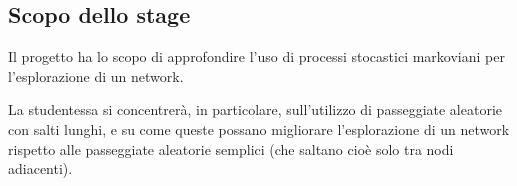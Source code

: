 
\subsection{Scopo dello stage}
	Il progetto ha lo scopo di approfondire l’uso di processi stocastici markoviani per l’esplorazione di un network. 
	
	La studentessa si concentrerà, in particolare, sull’utilizzo di passeggiate aleatorie con salti lunghi, e su come queste possano migliorare l’esplorazione di un network rispetto alle passeggiate aleatorie semplici (che saltano cioè solo tra nodi adiacenti).
	
	